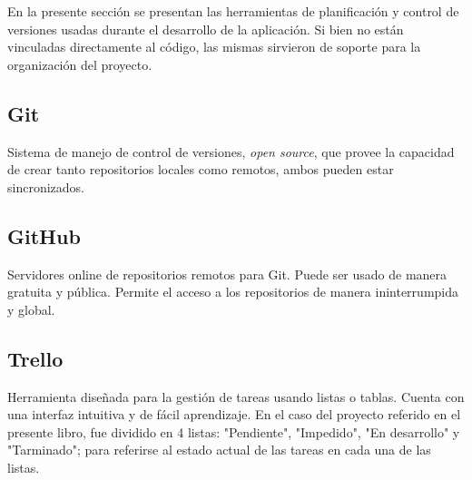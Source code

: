     En la presente sección se presentan las herramientas de planificación y control de versiones usadas durante el desarrollo de la aplicación. Si bien no están vinculadas directamente al código, las mismas sirvieron de soporte para la organización del proyecto.
    
        \subsection{Git}
        
        Sistema de manejo de control de versiones, \textit{open source}, que provee la capacidad de crear tanto repositorios locales como remotos, ambos pueden estar sincronizados.
        
        \subsection{GitHub}
        
        Servidores online de repositorios remotos para Git. Puede ser usado de manera gratuita y pública. Permite el acceso a los repositorios de manera ininterrumpida y global.
        
        \subsection{Trello}
        
        Herramienta diseñada para la gestión de tareas usando listas o tablas. Cuenta con una interfaz intuitiva y de fácil aprendizaje. En el caso del proyecto referido en el presente libro, fue dividido en 4 listas: "Pendiente", "Impedido", "En desarrollo" y "Tarminado"; para referirse al estado actual de las tareas en cada una de las listas.
        
        
        
    
\pagebreak